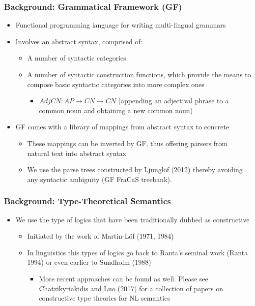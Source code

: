 \documentclass[11pt]{beamer}
\begin{document}
\begin{frame}[fragile]
	\frametitle{Background: Grammatical Framework (GF)}

\begin{itemize}
	\item Functional programming language for writing multi-lingual grammars
	
	\item Involves an abstract syntax, comprised of:
	
	
\begin{itemize}
	\item  A number of syntactic
	categories
	
	\item A number of syntactic construction functions, which
	provide the means to compose basic syntactic categories into more complex
	ones
	
\begin{itemize}
	\item
	
	$AdjCN : AP \to CN \to CN$ (appending an adjectival phrase to a common noun and obtaining a new common noun)
\end{itemize}\end{itemize}
\item GF comes with a library of mappings from abstract
syntax to concrete
\begin{itemize}
	\item These mappings can be inverted by GF, thus offering
parsers from natural text into abstract syntax

\item   We use the parse trees constructed by Ljungl\"of (2012)
thereby avoiding any syntactic ambiguity (GF FraCaS treebank).\end{itemize}\end{itemize}
\end{frame}


\begin{frame}[fragile]
	\frametitle{Background: Type-Theoretical Semantics}
	
	\begin{itemize}
		\item We use the type of logics that have been traditionally dubbed as constructive
		
			\begin{itemize}
				\item Initiated by the work of Martin-L\"of (1971, 1984)
				
				\item In linguistics this types of logics go back to Ranta's seminal work (Ranta 1994) or even earlier to Sundholm (1988)
				\begin{itemize}

				\item More recent approaches can be found as well. Please see Chatzikyriakidis and Luo (2017) for a collection of papers on constructive type theories for NL semantics


\end{itemize}\end{itemize}\end{itemize}

\end{frame}
\end{document}
